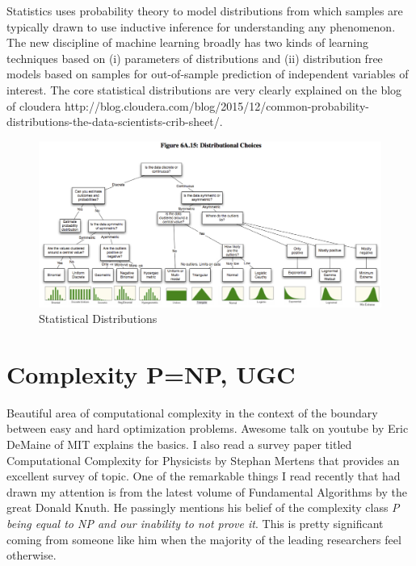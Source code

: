 \documentclass[11pt]{amsart}
\begin{document}
Statistics uses probability theory to model distributions from which samples are typically drawn to use inductive inference for understanding any phenomenon. The new discipline of machine learning broadly has two kinds of learning techniques based on (i) parameters of distributions and (ii) distribution free models  based on samples for out-of-sample prediction of independent variables of interest. The core statistical distributions are very clearly explained on the blog of cloudera http://blog.cloudera.com/blog/2015/12/common-probability-distributions-the-data-scientists-crib-sheet/. 

\begin{figure}[H]
\centering
  \includegraphics[width=\linewidth]{distributions.png}
  \caption{Statistical Distributions}
  \label{fig:congress}
\end{figure}

\section{Complexity P=NP, UGC}
Beautiful area of computational complexity in the context of the boundary between easy and hard optimization problems. Awesome talk on youtube by Eric DeMaine of MIT explains the basics. I also read a survey paper titled Computational Complexity for Physicists by Stephan Mertens that provides an excellent survey of topic. One of the remarkable things I read recently that had drawn my attention is from the latest volume of Fundamental Algorithms by the great Donald Knuth. He passingly mentions his belief of the complexity class \textit{P being equal to NP and our inability to not prove it}. This is pretty significant coming from someone like him when the majority of the leading researchers feel otherwise. 
\end{document}
